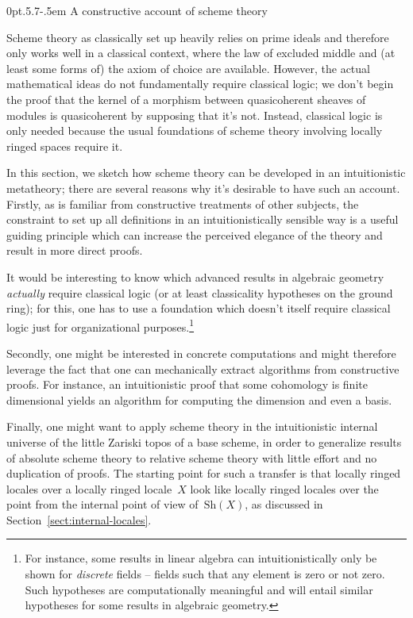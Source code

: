 \documentclass[10pt,reqno,a4paper]{amsbook}
\makeatletter
\theoremstyle{definition}
\theoremstyle{plain}
\theoremstyle{remark}
\newcommand{\Sh}{\mathrm{Sh}}
\newcommand{\?}{\,{:}\,}
\renewcommand{\_}{\mathpunct{.}\,}
\def\subsection{\@startsection{subsection}{2}%
  {0pt}{.5\linespacing\@plus.7\linespacing}{-.5em}%
  {\normalfont\bfseries}}
\makeatother
\begin{document}
\subsection{A constructive account of scheme theory}
\label{sect:constructive-scheme-theory}

Scheme theory as classically set up heavily relies on prime ideals and
therefore only works well in a classical context, where the law of excluded
middle and (at least some forms of) the axiom of choice are available. However,
the actual mathematical ideas do not fundamentally require classical logic; we
don't begin the proof that the kernel of a morphism between quasicoherent
sheaves of modules is quasicoherent by supposing that it's not. Instead,
classical logic is only needed because the usual foundations of scheme theory
involving locally ringed spaces require it.

In this section, we sketch how scheme theory can be developed in an
intuitionistic metatheory; there are several reasons why it's desirable to have
such an account. Firstly, as is familiar from constructive treatments of other
subjects, the constraint to set up all definitions in an intuitionistically
sensible way is a useful guiding principle which can increase the perceived
elegance of the theory and result in more direct proofs.

It would be interesting to know which advanced results in algebraic geometry
\emph{actually} require classical logic (or at least classicality hypotheses on
the ground ring); for this, one has to use a foundation
which doesn't itself require classical logic just for organizational
purposes.\footnote{For instance, some results in linear algebra can
intuitionistically only be shown for \emph{discrete} fields -- fields such that
any element is zero or not zero. Such hypotheses are computationally meaningful
and will entail similar hypotheses for some results in algebraic geometry.}

Secondly, one might be interested in concrete computations and might therefore
leverage the fact that one can mechanically extract algorithms from
constructive proofs. For instance, an intuitionistic proof that some cohomology
is finite dimensional yields an algorithm for computing the dimension and even
a basis.

Finally, one might want to apply scheme theory in the intuitionistic internal
universe of the little Zariski topos of a base scheme, in order to generalize
results of absolute scheme theory to relative scheme theory with little effort
and no duplication of proofs. The starting point for such a transfer is that
locally ringed locales over a locally ringed locale~$X$ look like locally
ringed locales over the point from the internal point of view of~$\Sh(X)$, as
discussed in Section~\ref{sect:internal-locales}.
\end{document}
